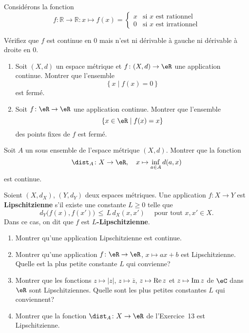  \exerNico Considérons la fonction
$$f:\mathbb{R}\rightarrow\mathbb{R}:x\mapsto f(x)=\left\{
\begin{array}{ll}
x&\text{si }x\text{ est rationnel}\\
0&\text{si }x\text{ est irrationnel}
\end{array}
\right.$$

Vérifiez que $f$ est continue en $0$ mais n'est ni dérivable à  gauche ni dérivable à droite en
$0$.

\exerNico 
\begin{enumerate}
\item Soit $(X,d)$ un espace métrique et $f \colon (X,d) \to \eR$ une application continue.
Montrer que l'ensemble $$\left\{ x \mid f(x) = 0 \right\}$$ est fermé.

\item Soit $f \colon \eR \to \eR$ une application continue.
Montrer que l'ensemble 
$$
\{ x \in \eR \mid f(x) = x\}
$$
des points fixes de $f$ est fermé.

\end{enumerate}

\exerNico  Soit $A$ un sous ensemble de l'espace métrique $(X,d)$.
Montrer que la fonction
$$
\dist_A \colon X \to \eR,
\quad x \mapsto \inf_{a \in A} d(a,x)
$$ 
est continue.


\exerNico  Soient $(X,d_X)$, $(Y,d_Y)$ deux espaces métriques.
Une application $f \colon X \to Y$ est {\bf Lipschitzienne}
s'il existe une constante $L \ge 0$ telle que
$$
d_Y \bigl( f(x), f(x') \bigr) \,\le\, L \,d_X (x,x') 
\quad \text{ pour tout } x,x' \in X.
$$
Dans ce cas, on dit que $f$ est {\bf $L$-Lipschitzienne}.


\begin{enumerate}
\item
Montrer qu'une application Lipschitzienne est continue.
\item Montrer qu'une application $f \colon \eR \to \eR$, $x \mapsto ax+b$
est Lipschitzienne.
Quelle est la plus petite constante $L$ qui convienne?

\item Montrer que les fonctions $z \mapsto |z|$, 
$z \mapsto \overline z$,
$z \mapsto {\rm Re\,} z$ et $z \mapsto {\rm Im\,} z$ 
de $\eC$ dans $\eR$ sont Lipschitziennes.
Quelle sont les plus petites constantes $L$ qui conviennent?
\item Montrer que la fonction $\dist_A \colon X \to \eR$ de l'Exercice~13 est Lipschitzienne.

\end{enumerate}


